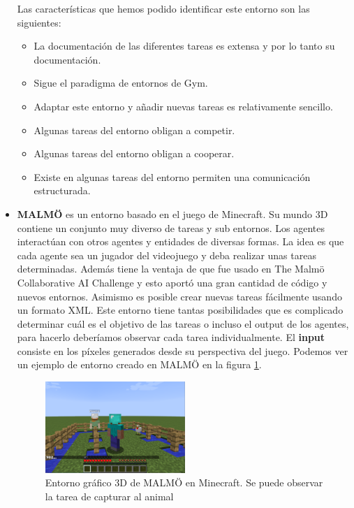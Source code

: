 \begin{itemize}
	      Las características que hemos podido identificar este entorno son las siguientes:
	      \begin{itemize}
		      \item La documentación de las diferentes tareas es extensa y por lo tanto su documentación.
		      \item Sigue el paradigma de entornos de Gym.
		      \item Adaptar este entorno y añadir nuevas tareas es relativamente sencillo.
		      \item Algunas tareas del entorno obligan a competir.
		      \item Algunas tareas del entorno obligan a cooperar.
		      \item Existe en algunas tareas del entorno permiten una comunicación estructurada.
	      \end{itemize}

	\item \textbf{MALMÖ} \cite {malmo} es un entorno basado en el juego de Minecraft. Su mundo 3D contiene un conjunto muy diverso de tareas y sub entornos. Los agentes interactúan con otros agentes y entidades de diversas formas. La idea es que cada agente sea un jugador del videojuego y deba realizar unas tareas determinadas. Además tiene la ventaja de que fue usado en The Malmö Collaborative AI Challenge y esto aportó una gran cantidad de código y nuevos entornos. Asimismo es posible crear nuevas tareas fácilmente usando un formato XML. Este entorno tiene tantas posibilidades que es complicado determinar cuál es el objetivo de las tareas o incluso el output de los agentes, para hacerlo deberíamos observar cada tarea individualmente. El \textbf{input} consiste en los píxeles generados desde su perspectiva del juego. Podemos ver un ejemplo de entorno creado en MALMÖ en la figura \ref {fig:malmo}.
	      \begin{figure}[h]
		      \centering
		      \includegraphics[width=0.5\textwidth]{img/mobchase.png}
		      \caption{Entorno gráfico 3D de MALMÖ en Minecraft. Se puede observar la tarea de capturar al animal \cite {malmo}}
		      \label{fig:malmo}
	      \end{figure}


\end{itemize}
